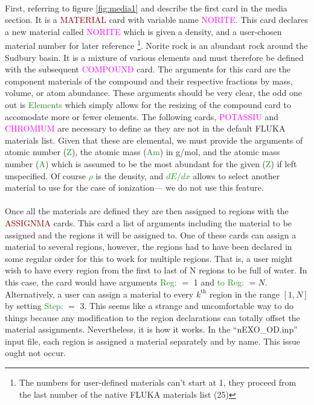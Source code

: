 \documentclass[10pt]{article}
\begin{document}
\paragraph{}
First, referring to figure \ref{fig:media1} and describe the first card in the media section. It is a \textcolor{Maroon}{MATERIAL} card with variable name \textcolor{magenta}{NORITE}. This card declares a new material called \textcolor{magenta}{NORITE} which is given a density, and a user-chosen material number for later reference \footnote{The numbers for user-defined materials can't start at 1, they proceed from the last number of the native FLUKA materials list (25)}. Norite rock is an abundant rock around the Sudbury basin. It is a mixture of various elements and must therefore be defined with the subsequent \textcolor{magenta}{COMPOUND} card. The arguments for this card are the component materials of the compound and their respective fractions by mass, volume, or atom abundance. These arguments should be very clear, the odd one out is \textcolor{ForestGreen}{Elements} which simply allows for the resizing of the compound card to accomodate more or fewer elements. The following cards, \textcolor{magenta}{POTASSIU} and \textcolor{magenta}{CHROMIUM} are necessary to define as they are not in the default FLUKA materials list. Given that these are elemental, we must provide the arguments of atomic number (\textcolor{ForestGreen}{Z}), the atomic mass (\textcolor{ForestGreen}{Am}) in g/mol, and the atomic mass number (\textcolor{ForestGreen}{A}) which is assumed to be the most abundant for the given (\textcolor{ForestGreen}{Z}) if left unspecified. Of course \textcolor{ForestGreen}{$\rho$} is the density, and \textcolor{ForestGreen}{$dE/dx$} allows to select another material to use for the case of ionization— we do not use this feature.

\paragraph{}
Once all the materials are defined they are then assigned to regions with the \textcolor{Maroon}{ASSIGNMA} cards. This card a list of arguments including the material to be assigned and the regions it will be assigned to. One of these cards can assign a material to several regions, however, the regions had to have been declared in some regular order for this to work for multiple regions. That is, a user might wish to have every region from the first to last of N regions to be full of water. In this case, the card would have arguments \textcolor{ForestGreen}{Reg:} $=$ 1 and \textcolor{ForestGreen}{to Reg:} $= N$. Alternatively, a user can assign a material to every $k^{\text{th}}$ region in the range $[1,N]$ by setting \textcolor{ForestGreen}{Step:} $=$ 3. This seems like a strange and uncomfortable way to do things because any modification to the region declarations can totally offset the material assignments. Nevertheless, it is how it works. In the ``nEXO\_OD.inp'' input file, each region is assigned a material separately and by name. This issue ought not occur.
\end{document}
